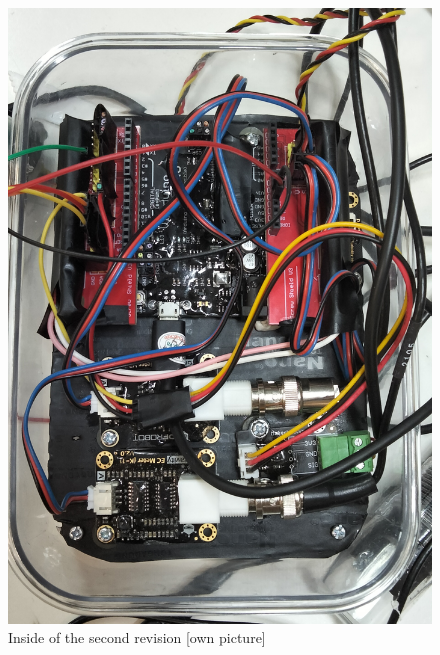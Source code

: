 \begin{figure}[h]
  \centering
  \begin{minipage}[b]{0.4\textwidth}
    \includegraphics[width=\textwidth]{070_design/package/52_rev2.jpg}
    \caption{Inside of the second revision [own picture]}
  \end{minipage}
  \hfill
  \begin{minipage}[b]{0.5\textwidth}

\end{minipage}
\end{figure}
